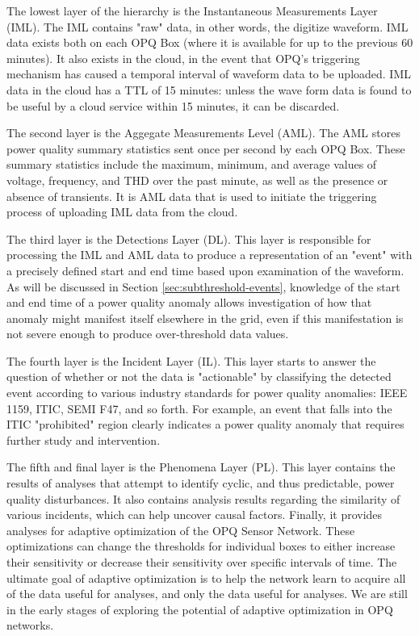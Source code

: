 The lowest layer of the hierarchy is the Instantaneous Measurements Layer (IML). The IML contains "raw" data, in other words, the digitize waveform.  IML data exists both on each OPQ Box (where it is available for up to the previous 60 minutes). It also exists in the cloud, in the event that OPQ's triggering mechanism has caused a temporal interval of waveform data to be uploaded. IML data in the cloud has a TTL of 15 minutes: unless the wave form data is found to be useful by a cloud service within 15 minutes, it can be discarded.

The second layer is the Aggegate Measurements Level (AML). The AML stores power quality summary statistics sent once per second by each OPQ Box. These summary statistics include the maximum, minimum, and average values of voltage, frequency, and THD over the past minute, as well as the presence or absence of transients. It is AML data that is used to initiate the triggering process of uploading IML data from the cloud.

The third layer is the Detections Layer (DL). This layer is responsible for processing the IML and AML data to produce a representation of an "event" with a precisely defined start and end time based upon examination of the waveform.  As will be discussed in Section \ref{sec:subthreshold-events}, knowledge of the start and end time of a power quality anomaly allows investigation of how that anomaly might manifest itself elsewhere in the grid, even if this manifestation is not severe enough to produce over-threshold data values.

The fourth layer is the Incident Layer (IL).  This layer starts to answer the question of whether or not the data is "actionable" by classifying the detected event according to various industry standards for power quality anomalies: IEEE 1159, ITIC, SEMI F47, and so forth.  For example, an event that falls into the ITIC "prohibited" region clearly indicates a power quality anomaly that requires further study and intervention.

The fifth and final layer is the Phenomena Layer (PL). This layer contains the results of analyses that attempt to identify cyclic, and thus predictable, power quality disturbances. It also contains analysis results regarding the similarity of various incidents, which can help uncover causal factors.  Finally, it provides analyses for adaptive optimization of the OPQ Sensor Network. These optimizations can change the thresholds for individual boxes to either increase their sensitivity or decrease their sensitivity over specific intervals of time. The ultimate goal of adaptive optimization is to help the network learn to acquire all of the data useful for analyses, and only the data useful for analyses.  We are still in the early stages of exploring the potential of adaptive optimization in OPQ networks.

